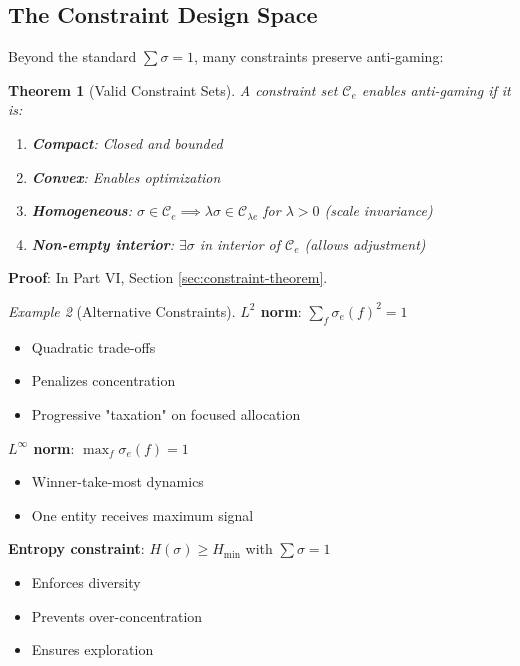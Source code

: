 \documentclass[11pt,a4paper]{article}
\newtheorem{theorem}{Theorem}[section]
\theoremstyle{definition}
\theoremstyle{remark}
\newtheorem{example}[theorem]{Example}
\newcommand{\C}{\mathcal{C}}
\begin{document}
\subsection{The Constraint Design Space}

Beyond the standard $\sum \sigma = 1$, many constraints preserve anti-gaming:

\begin{theorem}[Valid Constraint Sets]
\label{thm:valid-constraints}
A constraint set $\C_e$ enables anti-gaming if it is:
\begin{enumerate}
\item \textbf{Compact}: Closed and bounded
\item \textbf{Convex}: Enables optimization
\item \textbf{Homogeneous}: $\sigma \in \C_e \implies \lambda\sigma \in \C_{\lambda e}$ for $\lambda > 0$ (scale invariance)
\item \textbf{Non-empty interior}: $\exists \sigma$ in interior of $\C_e$ (allows adjustment)
\end{enumerate}
\end{theorem}

\textbf{Proof}: In Part VI, Section \ref{sec:constraint-theorem}.

\begin{example}[Alternative Constraints]
\textbf{$L^2$ norm}: $\sum_f \sigma_e(f)^2 = 1$
\begin{itemize}
\item Quadratic trade-offs
\item Penalizes concentration
\item Progressive "taxation" on focused allocation
\end{itemize}

\textbf{$L^\infty$ norm}: $\max_f \sigma_e(f) = 1$
\begin{itemize}
\item Winner-take-most dynamics
\item One entity receives maximum signal
\end{itemize}

\textbf{Entropy constraint}: $H(\sigma) \ge H_{\min}$ with $\sum \sigma = 1$
\begin{itemize}
\item Enforces diversity
\item Prevents over-concentration
\item Ensures exploration
\end{itemize}
\end{example}
\end{document}
